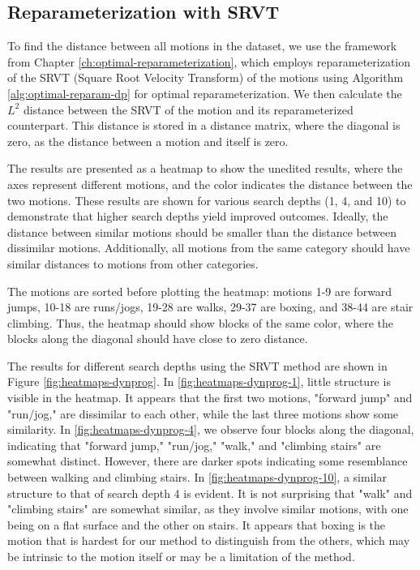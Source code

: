 \subsection{Reparameterization with SRVT}
\label{subsec:motion-capture-data-reparameterization-srvt}

To find the distance between all motions in the dataset, we use the framework from Chapter \ref{ch:optimal-reparameterization}, which employs reparameterization of the SRVT (Square Root Velocity Transform) of the motions using Algorithm \ref{alg:optimal-reparam-dp} for optimal reparameterization. We then calculate the \(L^2\) distance between the SRVT of the motion and its reparameterized counterpart. This distance is stored in a distance matrix, where the diagonal is zero, as the distance between a motion and itself is zero.

The results are presented as a heatmap to show the unedited results, where the axes represent different motions, and the color indicates the distance between the two motions. These results are shown for various search depths (1, 4, and 10) to demonstrate that higher search depths yield improved outcomes. Ideally, the distance between similar motions should be smaller than the distance between dissimilar motions. Additionally, all motions from the same category should have similar distances to motions from other categories.

The motions are sorted before plotting the heatmap: motions 1-9 are forward jumps, 10-18 are runs/jogs, 19-28 are walks, 29-37 are boxing, and 38-44 are stair climbing. Thus, the heatmap should show blocks of the same color, where the blocks along the diagonal should have close to zero distance.

The results for different search depths using the SRVT method are shown in Figure \ref{fig:heatmaps-dynprog}. In \ref{fig:heatmaps-dynprog-1}, little structure is visible in the heatmap. It appears that the first two motions, "forward jump" and "run/jog," are dissimilar to each other, while the last three motions show some similarity. In \ref{fig:heatmaps-dynprog-4}, we observe four blocks along the diagonal, indicating that "forward jump," "run/jog," "walk," and "climbing stairs" are somewhat distinct. However, there are darker spots indicating some resemblance between walking and climbing stairs. In \ref{fig:heatmaps-dynprog-10}, a similar structure to that of search depth 4 is evident. It is not surprising that "walk" and "climbing stairs" are somewhat similar, as they involve similar motions, with one being on a flat surface and the other on stairs. It appears that boxing is the motion that is hardest for our method to distinguish from the others, which may be intrinsic to the motion itself or may be a limitation of the method.

